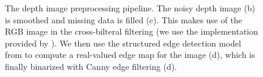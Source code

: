 \documentclass[10pt,twocolumn,letterpaper]{article}
\begin{document}
\begin{figure}[tb]
        \hfill
        \hfill
    \caption{
    The depth image preprocessing pipeline.
    The noisy depth image (b) is smoothed and missing data is filled (c). 
    This makes use of the RGB image in the cross-bilteral filtering (we use the implementation provided by \cite{silberman-eccv-2012}).
    We then use the structured edge detection model from \cite{dollar-iccv-2013} to compute a real-valued edge map for the image (d), which is finally binarized with Canny edge filtering \cite{canny-pami-1986} (d).
    }%
    \label{fig:preprocessing}
\end{figure}
\end{document}
